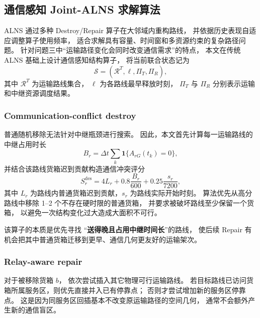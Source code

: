 \subsection{通信感知 Joint-ALNS 求解算法}

ALNS 通过多种 Destroy/Repair 算子在大邻域内重构路线，
并依据历史表现自适应调整算子使用频率，
适合求解具有容量、时间窗和多资源约束的复杂路径问题\cite{q3-ropke2006}。
针对问题三中“运输路径变化会同时改变通信需求”的特点，
本文在传统 ALNS 基础上设计通信感知结构算子，
将当前联合状态记为
\[
\mathcal S
=(\mathcal R^T,\boldsymbol{\ell},\Pi_T,\Pi_R),
\]
其中 $\mathcal R^T$ 为运输路线集合，
$\boldsymbol{\ell}$ 为各路线最早释放时刻，
$\Pi_T$ 与 $\Pi_R$ 分别表示运输和中继资源调度结果。

\subsubsection{Communication-conflict destroy}

普通随机移除无法针对中继瓶颈进行搜索。
因此，本文首先计算每一运输路线的中继占用时长
\begin{equation}
	B_r
	=\Delta t
	\sum_{k}
	\mathbf 1\{A_{rG}(t_k)=0\},
	\label{eq:q3-relay-burden}
\end{equation}
并结合该路线货箱迟到贡献构造通信冲突评分
\begin{equation}
	S_r^{\mathrm{des}}
	=4L_r
	+0.8\frac{B_r}{600}
	+0.25\frac{s_r}{7200},
	\label{eq:q3-destroy-score}
\end{equation}
其中 $L_r$ 为路线内普通货箱迟到贡献，$s_r$ 为路线实际开始时刻。
算法优先从高分路线中移除 1--2 个不存在硬时限的普通货箱，
并要求被破坏路线至少保留一个货箱，
以避免一次结构变化过大造成大面积不可行。

该算子的本质是优先寻找
“\textbf{送得晚且占用中继时间长}”的路线，
使后续 Repair 有机会把其中普通货箱迁移到更早、通信几何更友好的运输架次。

\subsubsection{Relay-aware repair}

对于被移除货箱 $b$，
依次尝试插入其它物理可行运输路线。
若目标路线已访问货箱所属服务区，则优先直接并入已有停靠点；
否则才尝试增加新的服务区停靠点。
这是因为同服务区回插基本不改变原运输路径的空间几何，
通常不会额外产生新的通信盲区。

